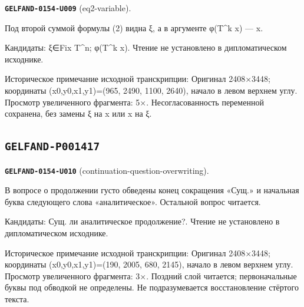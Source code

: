 \par\noindent\leavevmode{}\label{GELFAND-0154-U009}\textbf{\texttt{GELFAND-0154-U009}} (eq2-variable).\nopagebreak[4]\par
Под второй суммой формулы (2) видна ξ, а в аргументе φ(T\textasciicircum{}k x) — x.\par
Кандидаты: ξ∈Fix T\textasciicircum{}n; φ(T\textasciicircum{}k x). Чтение не установлено в дипломатическом исходнике.\par
Историческое примечание исходной транскрипции: Оригинал 2408×3448; координаты (x0,y0,x1,y1)=(965, 2490, 1100, 2640), начало в левом верхнем углу. Просмотр увеличенного фрагмента: 5×. Несогласованность переменной сохранена, без замены ξ на x или x на ξ.\par\medskip
\subsection*{\texttt{GELFAND-P001417}}
\par\noindent\leavevmode{}\label{GELFAND-0154-U010}\textbf{\texttt{GELFAND-0154-U010}} (continuation-question-overwriting).\nopagebreak[4]\par
В вопросе о продолжении густо обведены конец сокращения «Сущ.» и начальная буква следующего слова «аналитическое». Остальной вопрос читается.\par
Кандидаты: Сущ. ли аналитическое продолжение?. Чтение не установлено в дипломатическом исходнике.\par
Историческое примечание исходной транскрипции: Оригинал 2408×3448; координаты (x0,y0,x1,y1)=(190, 2005, 680, 2145), начало в левом верхнем углу. Просмотр увеличенного фрагмента: 3×. Поздний слой читается; первоначальные буквы под обводкой не определены. Не подразумевается восстановление стёртого текста.\par\medskip
